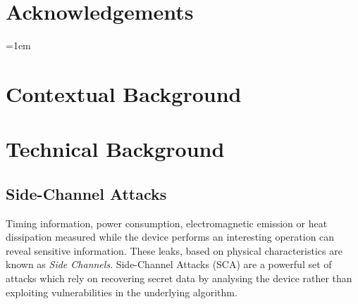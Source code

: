 \documentclass[10pt,a4paper,twoside]{book}
\begin{document}
\chapter*{Acknowledgements}

\noindent


\cleardoublepage
\pagestyle{marked}
\parindent=0in
\parskip=1em 



\chapter{Contextual Background}
\label{chap:context}



\chapter{Technical Background}
\label{chap:technical}


\section{Side-Channel Attacks}

Timing information, power consumption, electromagnetic emission or heat dissipation measured while the device performs an interesting operation can reveal sensitive information. These leaks, based on physical characteristics are known as \textit{Side Channels}. Side-Channel Attacks (SCA) are a powerful set of attacks which rely on recovering secret data by analysing the device rather than exploiting vulnerabilities in the underlying algorithm. 
\end{document}
